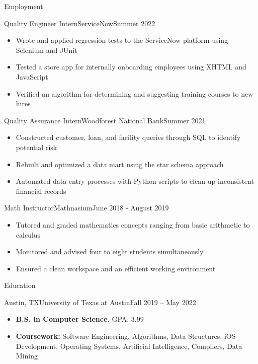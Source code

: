 \documentclass[]{mcdowellcv}
\begin{document}
	\makeheader
	
	\begin{cvsection}{Employment}
		\begin{cvsubsection}{Quality Engineer Intern}{ServiceNow}{Summer 2022}
			\begin{itemize}
				\item Wrote and applied regression tests to the ServiceNow platform using Selenium and JUnit
				\item Tested a store app for internally onboarding employees using XHTML and JavaScript
				\item Verified an algorithm for determining and suggesting training courses to new hires
				
			\end{itemize}
		\end{cvsubsection}
		
		\begin{cvsubsection}{Quality Assurance Intern}{Woodforest National Bank}{Summer 2021}
			\begin{itemize}
				\item Constructed customer, loan, and facility queries through SQL to identify potential risk
				\item Rebuilt and optimized a data mart using the star schema approach
				\item Automated data entry processes with Python scripts to clean up inconsistent financial records
			\end{itemize}
		\end{cvsubsection}
		
		\begin{cvsubsection}{Math Instructor}{Mathnasium}{June 2018 - August 2019}
			\begin{itemize}
				\item Tutored and graded mathematics concepts ranging from basic arithmetic to calculus
				\item Monitored and advised four to eight students simultaneously
				\item Ensured a clean workspace and an efficient working environment
			\end{itemize}
		\end{cvsubsection}
	\end{cvsection}
	
	\begin{cvsection}{Education}
		\begin{cvsubsection}{Austin, TX}{University of Texas at Austin}{Fall 2019 -- May 2022}
			\begin{itemize}
				\item \textbf{B.S. in Computer Science.} GPA: 3.99
				\item \textbf{Coursework:} Software Engineering, Algorithms, Data Structures, iOS Development, Operating Systems, Artificial Intelligence, Compilers, Data Mining
			\end{itemize}
		\end{cvsubsection}
	\end{cvsection}
	
\end{document}
